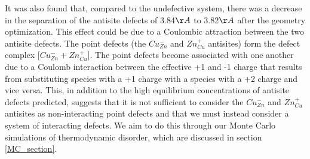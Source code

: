 It was also found that, compared to the undefective system, there was a decrease in the separation of the antisite defects of 3.84$\AA$ to 3.82$\AA$ after the geometry optimization. This effect could be due to a Coulombic attraction between the two antisite defects.
The point defects (the $Cu_{Zn}^-$ and $Zn_{Cu}^+$ antisites) form the defect complex [$Cu_{Zn}^- + Zn_{Cu}^+$]. The point defects become associated with one another due to a Coulomb interaction between the effective +1 and -1 charge that results from substituting species with a +1 charge with a species with a +2 charge and vice versa. This, in addition to the high equilibrium concentrations of antisite defects predicted, suggests that it is not sufficient to consider the $Cu_{Zn}^-$ and $Zn_{Cu}^+$ antisites as non-interacting point defects and that we must instead consider a system of interacting defects.
 We aim to do this through our Monte Carlo simulations of thermodynamic disorder, which are discussed in section \ref{MC_section}.
